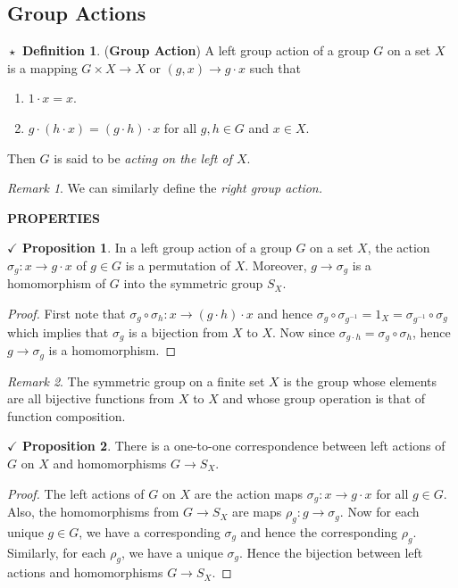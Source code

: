 \documentclass{article}
\theoremstyle{definition}
\newtheorem{definition}{$\boxed{\star}$ Definition}
\theoremstyle{remark}
\newtheorem*{remark}{Remark}
\theoremstyle{definition}
\theoremstyle{definition}
\newtheorem{proposition}{$\checkmark$ Proposition}
\theoremstyle{definition}
\theoremstyle{proof}
\newcommand{\inv}[1]{#1^{-1}}
\begin{document}
\subsection{Group Actions}
\begin{definition}
	(\textbf{Group Action}) A left group action of a group $ G $ on a set $ X $ is a mapping $ G\times X \to X $ or $ (g,x)\to g\cdot x $ such that
	\begin{enumerate}
		\item{$ 1\cdot x = x $.}
		\item{$ g\cdot(h\cdot x) = (g\cdot h)\cdot x$ for all $ g,h\in G $ and $ x\in X $.}
	\end{enumerate}
Then $ G $ is said to be \emph{acting on the left of $ X $}.
\end{definition}
\begin{remark}
	We can similarly define the \emph{right group action.}
\end{remark}
\hrulefill
\textbf{PROPERTIES}
\hrulefill
\begin{proposition}
	In a left group action of a group $ G $ on a set $ X $, the action $ \sigma_g : x \to g\cdot x $ of $ g\in G $ is a permutation of $ X $. Moreover, $ g\to \sigma_g $ is a homomorphism of $ G $ into the symmetric group $S_X $.
\end{proposition}
\begin{proof}
	First note that $ \sigma_g \circ \sigma_h : x\to (g\cdot h) \cdot x$ and hence $ \sigma_g \circ \sigma_{\inv{g}} = 1_X = \sigma_{\inv{g}} \circ \sigma_g $ which implies that $ \sigma_g $ is a bijection from $ X $ to $ X $. Now since $ \sigma_{g\cdot h} = \sigma_g \circ \sigma_h $, hence $ g \to \sigma_g $ is a homomorphism.
\end{proof}
\begin{remark}
	The symmetric group on a finite set $ X $ is the group whose elements are all bijective functions from $ X $ to $ X $ and whose group operation is that of function composition.
\end{remark}
\hrulefill
\begin{proposition}
	There is a one-to-one correspondence between left actions of $ G $ on $ X $ and homomorphisms $ G\to S_X $.
\end{proposition}
\begin{proof}
	The left actions of $ G $ on $ X $ are the action maps $ \sigma_g : x \to g\cdot x$ for all $ g\in G $. Also, the homomorphisms from $ G\to S_X $ are maps $ \rho_g : g \to \sigma_g $. Now for each unique $ g\in G $, we have a corresponding $ \sigma_g $ and hence the corresponding $ \rho_g $. Similarly, for each $ \rho_g $, we have a unique $ \sigma_g $. Hence the bijection between left actions and homomorphisms $ G\to S_X $.
\end{proof}
\end{document}
